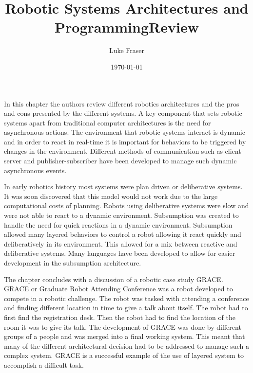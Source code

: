 \documentclass[letterpaper]{article}
\begin{document}
\title{{Robotic Systems Architectures and Programming\large Review} \\   }
\author{Luke Fraser}
\date{\today}
\maketitle

\begingroup
\renewcommand{\section}[2]{}


\endgroup

\section*{Summary}
In this chapter the authors review different robotics architectures and the pros and cons presented by the different systems. A key component that sets robotic systems apart from traditional computer architectures is the need for asynchronous actions. The environment that robotic systems interact is dynamic and in order to react in real-time it is important for behaviors to be triggered by changes in the environment. Different methods of communication such as client-server and publisher-subscriber have been developed to manage such dynamic asynchronous events.

In early robotics history most systems were plan driven or deliberative systems. It was soon discovered that this model would not work due to the large computational costs of planning. Robots using deliberative systems were slow and were not able to react to a dynamic environment. Subsumption was created to handle the need for quick reactions in a dynamic environment. Subsumption allowed many layered behaviors to control a robot allowing it react quickly and deliberatively in its environment. This allowed for a mix between reactive and deliberative systems. Many languages have been developed to allow for easier development in the subsumption architecture.

The chapter concludes with a discussion of a robotic case study GRACE. GRACE or Graduate Robot Attending Conference was a robot developed to compete in a robotic challenge. The robot was tasked with attending a conference and finding different location in time to give a talk about itself. The robot had to first find the registration desk. Then the robot had to find the location of the room it was to give its talk. The development of GRACE was done by different groups of a people and was merged into a final working system. This meant that many of the different architectural decision had to be addressed to manage such a complex system. GRACE is a successful example of the use of layered system to accomplish a difficult task. 
\end{document}
